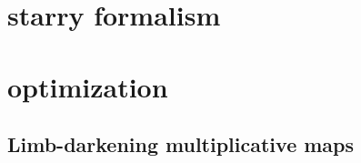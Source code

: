 \documentclass[modern]{aastex631}
\begin{document}


\newpage
\section{starry formalism}\label{starry}

\section{optimization}\label{optimization}
\subsection{Limb-darkening multiplicative maps}
\end{document}
